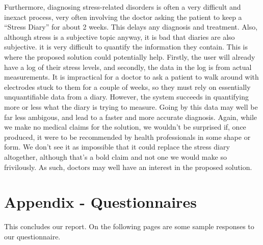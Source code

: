 \documentclass{scrartcl}
\begin{document}
Furthermore, diagnosing stress-related disorders is often a very difficult and inexact process, very often involving the doctor
asking the patient to keep a ``Stress Diary'' for about 2 weeks. This 
delays any diagnosis and treatment.
Also, although stress is a subjective topic anyway, it is bad that diaries are also subjective. it is very difficult to
quantify the information they contain. This is where the proposed solution could potentially help.
Firstly, the user will already have a log of their stress
levels, and secondly, the data in the log is from actual
measurements. It is impractical for a doctor to ask a patient to walk around with electrodes stuck to them for a couple of weeks,
so they must rely on essentially unquantifiable data from a diary. However, the system succeeds in quantifying more or less what
the diary is trying to measure. Going by this data may well be far less ambigous, and lead to a faster and
more accurate diagnosis. Again, while we make no medical claims for the solution, we wouldn't be surprised if, once produced,
it were to be recommended by health professionals in some shape or form. We don't see it as impossible that it could replace
the stress diary altogether, although that's a bold claim and not one we would make so frivilously. As such, doctors may
well have an interest in the proposed solution.

\section{Appendix - Questionnaires}
This concludes our report. On the following pages are some sample responses to our questionnaire.






\end{document}
